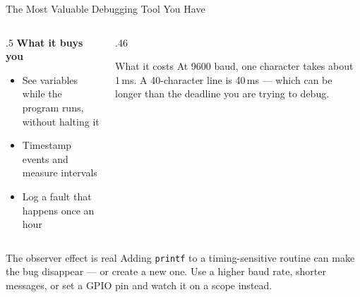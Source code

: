 \documentclass[9pt,aspectratio=169,xcolor=table]{beamer}
\begin{document}
\begin{frame}{The Most Valuable Debugging Tool You Have}
    \begin{columns}[c]
    \begin{column}{.5\textwidth}
        \textbf{What it buys you}
        \begin{itemize}
            \item See variables \alert{while the program runs}, without halting it
            \item Timestamp events and measure intervals
            \item Log a fault that happens once an hour
        \end{itemize}
    \end{column}
    \begin{column}{.46\textwidth}
        \begin{block}{What it costs}
            At 9600 baud, one character takes about \alert{1\,ms}. A 40-character
            line is \alert{40\,ms} --- which can be longer than the deadline you
            are trying to debug.
        \end{block}
    \end{column}
    \end{columns}

    \vspace{3mm}
    \begin{block}{The observer effect is real}
        Adding \texttt{printf} to a timing-sensitive routine can make the bug
        disappear --- or create a new one. Use a \alert{higher baud rate},
        \alert{shorter messages}, or set a \alert{GPIO pin} and watch it on a
        scope instead.
    \end{block}
\end{frame}
\end{document}
